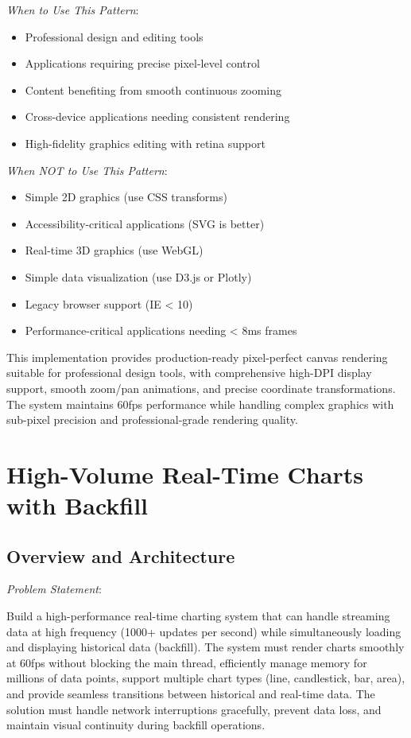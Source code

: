 \documentclass[11pt]{article}
\begin{document}
\emph{When to Use This Pattern}:

\begin{itemize}
\item Professional design and editing tools
\item Applications requiring precise pixel-level control
\item Content benefiting from smooth continuous zooming
\item Cross-device applications needing consistent rendering
\item High-fidelity graphics editing with retina support
\end{itemize}

\emph{When NOT to Use This Pattern}:

\begin{itemize}
\item Simple 2D graphics (use CSS transforms)
\item Accessibility-critical applications (SVG is better)
\item Real-time 3D graphics (use WebGL)
\item Simple data visualization (use D3.js or Plotly)
\item Legacy browser support (IE < 10)
\item Performance-critical applications needing < 8ms frames
\end{itemize}

This implementation provides production-ready pixel-perfect canvas rendering suitable for professional design tools, with comprehensive high-DPI display support, smooth zoom/pan animations, and precise coordinate transformations. The system maintains 60fps performance while handling complex graphics with sub-pixel precision and professional-grade rendering quality.
\section{High-Volume Real-Time Charts with Backfill}
\label{sec:org9b9cc93}

\subsection{Overview and Architecture}
\label{sec:orgd6d27d3}

\emph{Problem Statement}:

Build a high-performance real-time charting system that can handle streaming data at high frequency (1000+ updates per second) while simultaneously loading and displaying historical data (backfill). The system must render charts smoothly at 60fps without blocking the main thread, efficiently manage memory for millions of data points, support multiple chart types (line, candlestick, bar, area), and provide seamless transitions between historical and real-time data. The solution must handle network interruptions gracefully, prevent data loss, and maintain visual continuity during backfill operations.
\end{document}
